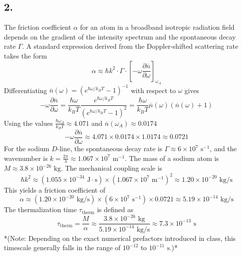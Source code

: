\documentclass[11pt,a4paper]{article}
\begin{document}
\subsection*{2.}
The friction coefficient $\alpha$ for an atom in a broadband isotropic radiation field depends on the gradient of the intensity spectrum and the spontaneous decay rate $\Gamma$. A standard expression derived from the Doppler-shifted scattering rate takes the form
\[
\alpha \approx \hbar k^2 \cdot \Gamma \cdot \left[ -\omega \frac{\partial \overline{n}}{\partial \omega} \right]_{\omega_A}
\]
Differentiating $\overline{n}(\omega) = (e^{\hbar\omega/k_B T}-1)^{-1}$ with respect to $\omega$ gives
\[
-\omega \frac{\partial \overline{n}}{\partial \omega} = \frac{\hbar\omega}{k_B T} \frac{e^{\hbar\omega/k_B T}}{\left(e^{\hbar\omega/k_B T}-1\right)^2} = \frac{\hbar\omega}{k_B T} \overline{n}(\omega) \left(\overline{n}(\omega) + 1\right)
\]
Using the values $\frac{\hbar\omega_A}{k_B T} \approx 4.071$ and $\overline{n}(\omega_A) \approx 0.0174$
\[
-\omega \frac{\partial \overline{n}}{\partial \omega} \approx 4.071 \times 0.0174 \times 1.0174 \approx 0.0721
\]
For the sodium $D$-line, the spontaneous decay rate is $\Gamma \approx 6 \times 10^7\text{ s}^{-1}$, and the wavenumber is $k = \frac{2\pi}{\lambda} \approx 1.067 \times 10^7\text{ m}^{-1}$. The mass of a sodium atom is $M \approx 3.8 \times 10^{-26}\text{ kg}$. The mechanical coupling scale is
\[
\hbar k^2 \approx (1.055 \times 10^{-34}\text{ J}\cdot\text{s}) \times (1.067 \times 10^7\text{ m}^{-1})^2 \approx 1.20 \times 10^{-20}\text{ kg/s}
\]
This yields a friction coefficient of
\[
\alpha \approx (1.20 \times 10^{-20}\text{ kg/s}) \times (6 \times 10^7\text{ s}^{-1}) \times 0.0721 \approx 5.19 \times 10^{-14}\text{ kg/s}
\]
The thermalization time $\tau_{\text{therm}}$ is defined as
\[
\tau_{\text{therm}} = \frac{M}{\alpha} \approx \frac{3.8 \times 10^{-26}\text{ kg}}{5.19 \times 10^{-14}\text{ kg/s}} \approx {7.3 \times 10^{-13}\text{ s}}
\]
*(Note: Depending on the exact numerical prefactors introduced in class, this timescale generally falls in the range of $10^{-12}$ to $10^{-11}\text{ s}$.)*
\end{document}
